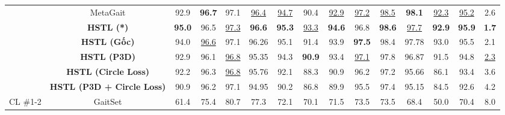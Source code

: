 \begin{table}[h]
{\begin{tabular}{c|c|ccccccccccc|c|c}
                                                       & MetaGait \cite{dou2022metagait}               & 92.9                     & \textbf{96.7}           & 97.1             & \underline{96.4} & \underline{94.7} & 90.4             & \underline{92.9} & \underline{97.2} & \underline{98.5} & \textbf{98.1}    & \underline{92.3} & \underline{95.2} & 2.6             \\
            \cline{2-15}                               & \textbf{HSTL (*)}                             & \textbf{95.0}            & 96.5                    & \underline{97.3} & \textbf{96.6}    & \textbf{95.3}    & \underline{93.3} & \textbf{94.6}    & 96.8             & \textbf{98.6}    & \underline{97.7} & \textbf{92.9}    & \textbf{95.9}    & \textbf{1.7}    \\
            \cline{2-15}                               & \textbf{HSTL (Gốc)}                           & 94.0                     & \underline{96.6}        & 97.1             & 96.26            & 95.1             & 91.4             & 93.9             & \textbf{97.5}    & 98.4             & 97.78            & 93.0             & 95.5             & 2.1             \\
            \cline{2-15}                               & \textbf{HSTL (P3D)}                           & 92.9                     & 96.1                    & \underline{96.8} & 95.35            & 94.3             & \textbf{90.9}    & 93.4             & \underline{97.1} & 97.8             & 96.87            & 91.5             & 94.8             & \underline{2.3} \\
                                                       & \textbf{HSTL (Circle Loss)}                   & 92.2                     & 96.3                    & \underline{96.8} & 95.76            & 92.1             & 88.3             & 90.9             & 96.2             & 97.2             & 95.66            & 86.1             & 93.4             & 3.6             \\
                                                       & \textbf{HSTL (P3D + Circle Loss)}             & 90.9                     & 96.2                    & 97.1             & 94.95            & 90.2             & 86.8             & 89.9             & 95.5             & 97.4             & 95.15            & 84.5             & 92.6             & 4.2             \\
            \hline
            \multirow{4}[12]{*}{CL \#1-2}              & GaitSet \cite{chao2019gaitset}                & 61.4                     & 75.4                    & 80.7             & 77.3             & 72.1             & 70.1             & 71.5             & 73.5             & 73.5             & 68.4             & 50.0             & 70.4             & 8.0             \\

\end{tabular}}
\end{table}
